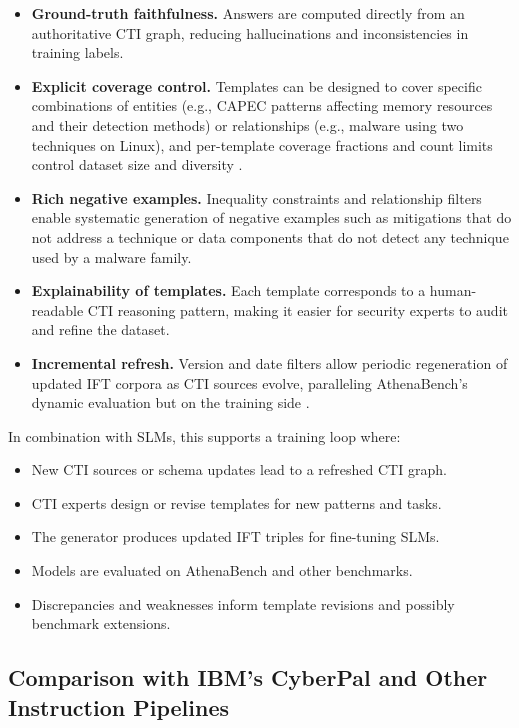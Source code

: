 \documentclass[unnumsec,webpdf,contemporary,large]{oup-authoring-template}
\theoremstyle{thmstyleone}
\theoremstyle{thmstyletwo}
\theoremstyle{thmstylethree}
\begin{document}
\begin{itemize}
  \item \textbf{Ground-truth faithfulness.} Answers are computed directly from an authoritative CTI graph, reducing hallucinations and inconsistencies in training labels.
  \item \textbf{Explicit coverage control.} Templates can be designed to cover specific combinations of entities (e.g., CAPEC patterns affecting memory resources and their detection methods) or relationships (e.g., malware using two techniques on Linux), and per-template coverage fractions and count limits control dataset size and diversity \cite{cardei2025ift}.
  \item \textbf{Rich negative examples.} Inequality constraints and relationship filters enable systematic generation of negative examples such as mitigations that do not address a technique or data components that do not detect any technique used by a malware family.
  \item \textbf{Explainability of templates.} Each template corresponds to a human-readable CTI reasoning pattern, making it easier for security experts to audit and refine the dataset.
  \item \textbf{Incremental refresh.} Version and date filters allow periodic regeneration of updated IFT corpora as CTI sources evolve, paralleling AthenaBench's dynamic evaluation but on the training side \cite{cardei2025ift,alam2025athenabench}.
\end{itemize}

In combination with SLMs, this supports a training loop where:

\begin{itemize}
  \item New CTI sources or schema updates lead to a refreshed CTI graph.
  \item CTI experts design or revise templates for new patterns and tasks.
  \item The generator produces updated IFT triples for fine-tuning SLMs.
  \item Models are evaluated on AthenaBench and other benchmarks.
  \item Discrepancies and weaknesses inform template revisions and possibly benchmark extensions.
\end{itemize}

\subsection{Comparison with IBM's CyberPal and Other Instruction Pipelines}
\end{document}
